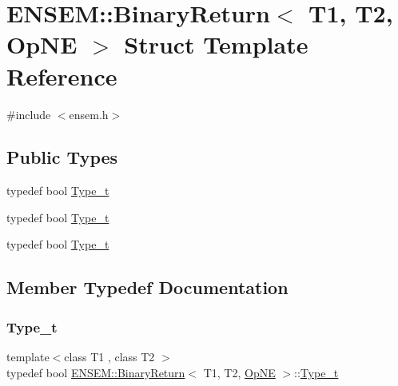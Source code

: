\hypertarget{structENSEM_1_1BinaryReturn_3_01T1_00_01T2_00_01OpNE_01_4}{}\section{E\+N\+S\+EM\+:\+:Binary\+Return$<$ T1, T2, Op\+NE $>$ Struct Template Reference}
\label{structENSEM_1_1BinaryReturn_3_01T1_00_01T2_00_01OpNE_01_4}


{\ttfamily \#include $<$ensem.\+h$>$}

\subsection*{Public Types}
\begin{DoxyCompactItemize}
\item 
typedef bool \mbox{\hyperlink{structENSEM_1_1BinaryReturn_3_01T1_00_01T2_00_01OpNE_01_4_a9da65a077e200526d6270d806c19dcd6}{Type\+\_\+t}}
\item 
typedef bool \mbox{\hyperlink{structENSEM_1_1BinaryReturn_3_01T1_00_01T2_00_01OpNE_01_4_a9da65a077e200526d6270d806c19dcd6}{Type\+\_\+t}}
\item 
typedef bool \mbox{\hyperlink{structENSEM_1_1BinaryReturn_3_01T1_00_01T2_00_01OpNE_01_4_a9da65a077e200526d6270d806c19dcd6}{Type\+\_\+t}}
\end{DoxyCompactItemize}


\subsection{Member Typedef Documentation}
\mbox{\label{structENSEM_1_1BinaryReturn_3_01T1_00_01T2_00_01OpNE_01_4_a9da65a077e200526d6270d806c19dcd6}} 
\subsubsection{\texorpdfstring{Type\_t}{Type\_t}\hspace{0.1cm}{\footnotesize\ttfamily [1/3]}}
{\footnotesize\ttfamily template$<$class T1 , class T2 $>$ \\
typedef bool \mbox{\hyperlink{structENSEM_1_1BinaryReturn}{E\+N\+S\+E\+M\+::\+Binary\+Return}}$<$ T1, T2, \mbox{\hyperlink{structENSEM_1_1OpNE}{Op\+NE}} $>$\+::\mbox{\hyperlink{structENSEM_1_1BinaryReturn_3_01T1_00_01T2_00_01OpNE_01_4_a9da65a077e200526d6270d806c19dcd6}{Type\+\_\+t}}}


